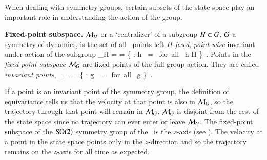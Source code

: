 
When dealing with symmetry groups, certain subsets of the state space play an important role in understanding the action of the group.

\begin{definition}
\label{def:centralizer}
\textbf{Fixed-point subspace.}
${\cal M}_H$ or a `centralizer' of a subgroup $H \subset G$,
$G$ a symmetry of dynamics, is the set of all \statesp\
points left \emph{$H$-fixed}, \emph{point-wise} invariant
under action of the subgroup
\beq
\pS_H =  =
   \{ \ssp \in \pS : {h} \, \ssp = \ssp \mbox{ for all } h \in H \}
\,.
Points in the \emph{fixed-point subspace}  ${\cal M}_{G}$ are fixed
points of the full group action. They are called \emph{invariant
points},
\beq
\pS_\Group = \Fix{\Group} =
   \{ \ssp \in \pS : {g} \, \ssp = \ssp \mbox{ for all } g \in \Group \}
\,.
\end{definition}

If a point is an invariant point of the symmetry group, the definition of equivariance  tells us that the velocity at that point is also in ${\cal M}_{G}$, so the trajectory through that point will remain in ${\cal M}_{G}$. ${\cal M}_{G}$ is disjoint from the rest of the state space since no trajectory can ever enter or leave ${\cal M}_{G}$. The fixed-point subspace of the $\textrm{SO}(2)$ symmetry group of the \cLe\ is the $z$-axis (see ). The velocity at a point in the state space points only in the $z$-direction and so the trajectory remains on the $z$-axis for all time as expected.

